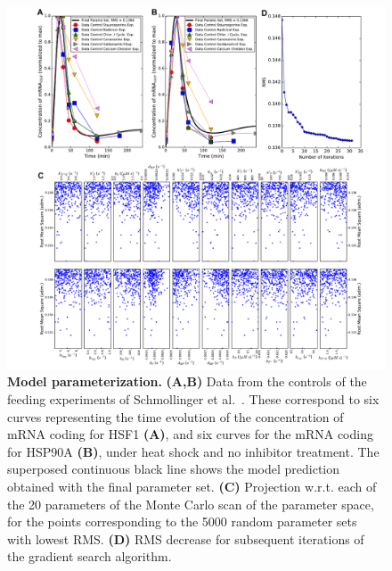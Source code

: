 \documentclass[oneside, 10pt, a4paper, twocolumn]{article}
\begin{document}
\begin{figure}
\centering
\includegraphics[width=\textwidth]{Figure2_Paper.pdf}
\caption{\small{\textbf{Model parameterization.} \textbf{(A,B)} Data from the controls of the feeding
experiments of Schmollinger et al.~\cite{Schmollinger2013}. These correspond to six curves
representing the time evolution of the concentration of mRNA coding
for HSF1 \textbf{(A)}, and six curves for the mRNA coding for HSP90A \textbf{(B)}, under heat
shock and no inhibitor treatment. The superposed continuous black line shows the model prediction obtained with the final parameter set. \textbf{(C)} Projection w.r.t. each of the 20 parameters of the Monte Carlo scan of the parameter space, for the points corresponding to the 5000 random parameter sets with lowest RMS. \textbf{(D)} RMS decrease for subsequent iterations of the gradient search algorithm.}
}
\label{Figure2label}
\end{figure}

\clearpage
\end{document}
